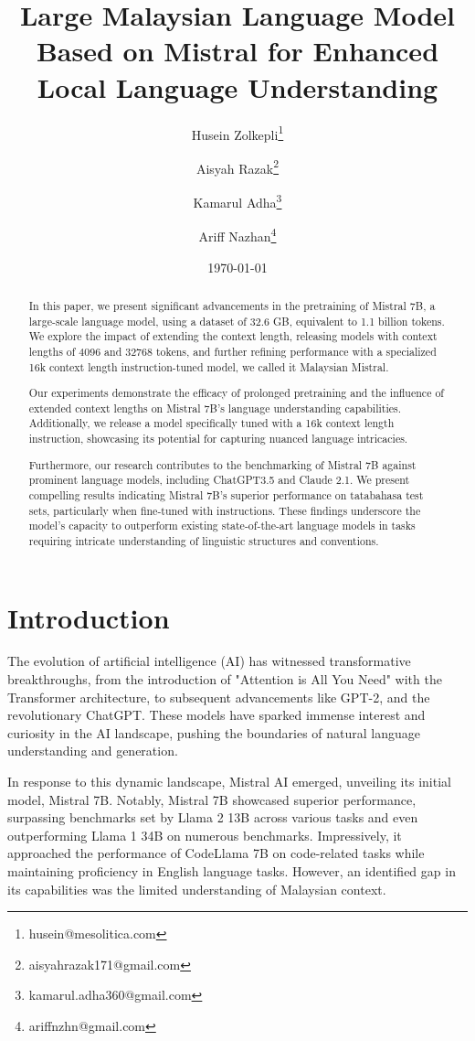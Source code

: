 \documentclass{article}
\title{Large Malaysian Language Model Based on Mistral for Enhanced Local Language Understanding}
\author{
  Husein Zolkepli\thanks{husein@mesolitica.com} \and 
  Aisyah Razak\thanks{aisyahrazak171@gmail.com} \and
  Kamarul Adha\thanks{kamarul.adha360@gmail.com} \and
  Ariff Nazhan\thanks{ariffnzhn@gmail.com}
}
\date{\today}
\begin{document}
\maketitle

\begin{abstract}
    In this paper, we present significant advancements in the pretraining of Mistral 7B, a large-scale language model, using a dataset of 32.6 GB, equivalent to 1.1 billion tokens. We explore the impact of extending the context length, releasing models with context lengths of 4096 and 32768 tokens, and further refining performance with a specialized 16k context length instruction-tuned model, we called it Malaysian Mistral.

    Our experiments demonstrate the efficacy of prolonged pretraining and the influence of extended context lengths on Mistral 7B's language understanding capabilities. Additionally, we release a model specifically tuned with a 16k context length instruction, showcasing its potential for capturing nuanced language intricacies.

    Furthermore, our research contributes to the benchmarking of Mistral 7B against prominent language models, including ChatGPT3.5 and Claude 2.1. We present compelling results indicating Mistral 7B's superior performance on tatabahasa test sets, particularly when fine-tuned with instructions. These findings underscore the model's capacity to outperform existing state-of-the-art language models in tasks requiring intricate understanding of linguistic structures and conventions.
\end{abstract}

\section{Introduction}
The evolution of artificial intelligence (AI) has witnessed transformative breakthroughs, from the introduction of "Attention is All You Need" with the Transformer architecture, to subsequent advancements like GPT-2, and the revolutionary ChatGPT. These models have sparked immense interest and curiosity in the AI landscape, pushing the boundaries of natural language understanding and generation.

In response to this dynamic landscape, Mistral AI emerged, unveiling its initial model, Mistral 7B. Notably, Mistral 7B showcased superior performance, surpassing benchmarks set by Llama 2 13B across various tasks and even outperforming Llama 1 34B on numerous benchmarks. Impressively, it approached the performance of CodeLlama 7B on code-related tasks while maintaining proficiency in English language tasks. However, an identified gap in its capabilities was the limited understanding of Malaysian context.
\end{document}
